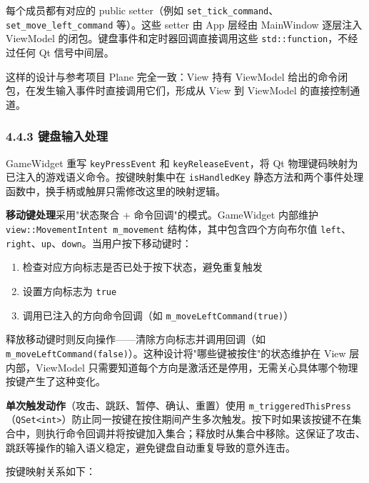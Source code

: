 \documentclass[12pt,fontset=none]{ctexart}
\begin{document}
每个成员都有对应的 public setter（例如 \texttt{set\_tick\_command}、\texttt{set\_move\_left\_command} 等）。这些 setter 由 App 层经由 MainWindow 逐层注入 ViewModel 的闭包。键盘事件和定时器回调直接调用这些 \texttt{std::function}，不经过任何 Qt 信号中间层。

这样的设计与参考项目 Plane 完全一致：View 持有 ViewModel 给出的命令闭包，在发生输入事件时直接调用它们，形成从 View 到 ViewModel 的直接控制通道。

\subsubsection{4.4.3 键盘输入处理}

GameWidget 重写 \texttt{keyPressEvent} 和 \texttt{keyReleaseEvent}，将 Qt 物理键码映射为已注入的游戏语义命令。按键映射集中在 \texttt{isHandledKey} 静态方法和两个事件处理函数中，换手柄或触屏只需修改这里的映射逻辑。

\textbf{移动键处理}采用"状态聚合 + 命令回调"的模式。GameWidget 内部维护 \texttt{view::MovementIntent m\_movement} 结构体，其中包含四个方向布尔值 \texttt{left}、\texttt{right}、\texttt{up}、\texttt{down}。当用户按下移动键时：

\begin{enumerate}
\item 检查对应方向标志是否已处于按下状态，避免重复触发
\item 设置方向标志为 \texttt{true}
\item 调用已注入的方向命令回调（如 \texttt{m\_moveLeftCommand(true)}）
\end{enumerate}

释放移动键时则反向操作——清除方向标志并调用回调（如 \texttt{m\_moveLeftCommand(false)}）。这种设计将"哪些键被按住"的状态维护在 View 层内部，ViewModel 只需要知道每个方向是激活还是停用，无需关心具体哪个物理按键产生了这种变化。

\textbf{单次触发动作}（攻击、跳跃、暂停、确认、重置）使用 \texttt{m\_triggeredThisPress}（\texttt{QSet<int>}）防止同一按键在按住期间产生多次触发。按下时如果该按键不在集合中，则执行命令回调并将按键加入集合；释放时从集合中移除。这保证了攻击、跳跃等操作的输入语义稳定，避免键盘自动重复导致的意外连击。

按键映射关系如下：
\end{document}
